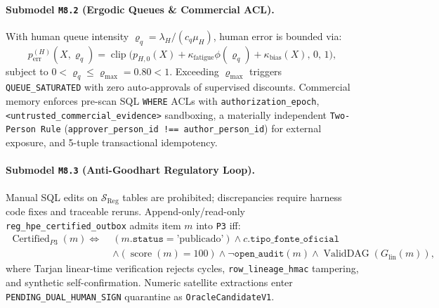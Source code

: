 \documentclass[10pt,twocolumn]{article}
\begin{document}
\paragraph{Submodel \texttt{M8.2} (Ergodic Queues \& Commercial ACL).}
With human queue intensity $\varrho_q = \lambda_H/(c_q\mu_H)$, human error is bounded via:
\begin{equation}
p_{\mathrm{err}}^{(H)}(X,\varrho_q) = \operatorname{clip}\!\bigl(p_{H,0}(X) + \kappa_{\mathrm{fatigue}}\phi(\varrho_q) + \kappa_{\mathrm{bias}}(X),\, 0,\, 1\bigr),
\end{equation}
subject to $0 < \varrho_q \le \varrho_{\max} = 0.80 < 1$. Exceeding $\varrho_{\max}$ triggers \texttt{QUEUE\_SATURATED} with zero auto-approvals of supervised discounts. Commercial memory enforces pre-scan SQL \texttt{WHERE} ACLs with \texttt{authorization\_epoch}, \texttt{<untrusted\_commercial\_evidence>} sandboxing, a materially independent \texttt{Two-Person Rule} (\texttt{approver\_person\_id !== author\_person\_id}) for external exposure, and 5-tuple transactional idempotency.

\paragraph{Submodel \texttt{M8.3} (Anti-Goodhart Regulatory Loop).}
Manual SQL edits on $\mathcal{S}_{\mathrm{Reg}}$ tables are prohibited; discrepancies require harness code fixes and traceable reruns. Append-only/read-only \texttt{reg\_hpe\_certified\_outbox} admits item $m$ into \texttt{P3} iff:
\begin{equation}
\begin{aligned}
\operatorname{Certified}_{P3}(m) \iff\;& (m.\texttt{status}=\text{'publicado'}) \land c.\texttt{tipo\_fonte\_oficial} \\
&\land (\operatorname{score}(m)=100) \land \neg\texttt{open\_audit}(m) \land \operatorname{ValidDAG}(G_{\mathrm{lin}}(m)),
\end{aligned}
\end{equation}
where Tarjan linear-time verification \cite{tarjan1972depth} rejects cycles, \texttt{row\_lineage\_hmac} tampering, and synthetic self-confirmation. Numeric satellite extractions enter \texttt{PENDING\_DUAL\_HUMAN\_SIGN} quarantine as \texttt{OracleCandidateV1}.
\end{document}
